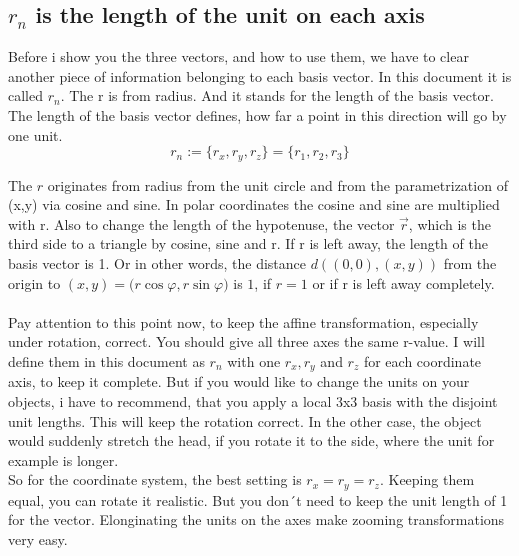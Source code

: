 \documentclass[a4paper]{article}
\begin{document}
\subsection{$r_{n}$ is the length of the unit on each axis}

Before i show you the three vectors, and how to use them, we have to clear another piece of information belonging to each
basis vector. In this document it is called $r_{n}$. The r is from radius. And it stands for the length of the basis vector.
The length of the basis vector defines, how far a point in this direction will go by one unit.\\
\begin{displaymath}
r_{n} := \{ r_{x}, r_{y}, r_{z} \} = \{ r_{1}, r_{2}, r_{3} \}
\end{displaymath}

The $r$ originates from radius from the unit circle and from the parametrization of (x,y) via cosine and sine. 
In polar coordinates the cosine and sine are multiplied with r. Also to change the length of the hypotenuse, 
the vector $\vec{r}$, which is the third side to a triangle by cosine, sine and r. 
If r is left away, the length of the basis vector is 1. Or in other words, the distance $d((0,0),(x,y))$ from the origin to $(x,y)=($$r \cos \varphi$$, $$r \sin \varphi$$)$ is $1$, if $r=1$ or if r is left away completely.\\

\\

Pay attention to this point now, to keep the affine transformation, especially under rotation, correct. You should give all three
axes the same r-value. I will define them in this document as $r_{n}$ with one $r_x, r_y$ and $r_z$ for each coordinate axis,
to keep it complete. But if you would like to change the units on your objects, i have to recommend, that you apply a local
3x3 basis with the disjoint unit lengths. This will keep the rotation correct. In the other case, the object would suddenly
stretch the head, if you rotate it to the side, where the unit for example is longer.\\

So for the coordinate system, the best setting is $r_x = r_y = r_z$. Keeping them equal, you can rotate it realistic. But you
don´t need to keep the unit length of 1 for the vector. Elonginating the units on the axes make zooming transformations very
easy.\\
\end{document}
